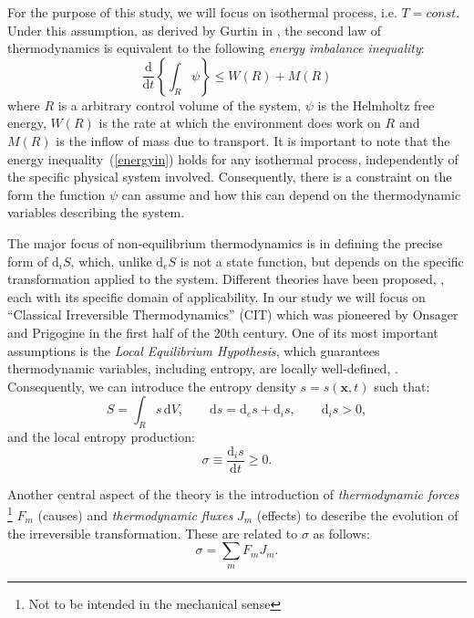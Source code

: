 \documentclass[runningheads]{llncs}
\renewcommand{\d}{\ensuremath{\text{d}}}
\begin{document}
For the purpose of this study, we will focus on isothermal process, i.e. $T=const$. Under this assumption, as derived by Gurtin in \cite{GURTIN}, the second law of thermodynamics is equivalent to the following \textit{energy imbalance inequality}:
\begin{equation}
\frac{\d}{\d t} \left\{\int_R \psi \right\}\leq W(R) + M(R) \label{energyin}
\end{equation}
where $R$ is a arbitrary control volume of the system, $\psi$ is the Helmholtz free energy, $W(R)$ is the rate at which the environment does work on $R$ and $M(R)$ is the inflow of mass due to transport. It is important to note that the energy inequality~(\ref{energyin}) holds for any isothermal process, independently of the specific physical system involved. Consequently, there is a constraint on the form the function $\psi$ can assume and how this can depend on the thermodynamic variables describing the system. 

The major focus of non-equilibrium thermodynamics is in defining the precise form of $\d_i S$, which, unlike $\d_e S$ is not a state function, but depends on the specific transformation applied to the system. 
Different theories have been proposed, \cite{NET}, each with its specific domain of applicability. In our study we will focus on \textquotedblleft Classical Irreversible Thermodynamics'' (CIT) which was pioneered by Onsager \cite{onsager} and Prigogine \cite{prigogine} in the first half of the 20th century. One of its most important assumptions is the \textit{Local Equilibrium Hypothesis}, which guarantees thermodynamic variables, including entropy, are locally well-defined, \cite{NET}. 
Consequently, we can introduce the entropy density $s=s(\mathbf{x},t)$ such that:
\begin{equation}
S = \int_{R} s \,\d V, \qquad \d s = \d_e s + \d_is, \qquad \d_is > 0, 
\end{equation}
and the local entropy production:
\begin{equation}
\sigma \equiv \frac{\d_i s}{\d t} \geq 0.
\end{equation}

Another central aspect of the theory is the introduction of \textit{thermodynamic forces} \footnote{Not to be intended in the mechanical sense} $F_m$ (causes) and \textit{thermodynamic fluxes} $J_m$ (effects) to describe the evolution of the irreversible transformation. These are related to $\sigma$ as follows:
\begin{equation}
\sigma = \sum_m F_m J_m.
\label{2law}
\end{equation}
\end{document}
